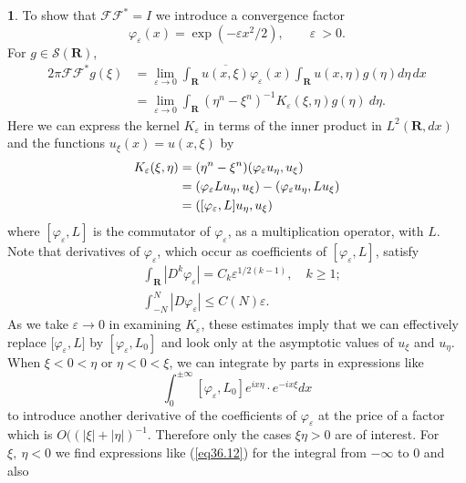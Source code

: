 \documentclass{surv-l}
\theoremstyle{plain}
\theoremstyle{definition}
\newtheorem*{sop}{\sc{Sketch of Proof}}
\numberwithin{equation}{chapter}
\begin{document}
\begin{sop}
To show that $\mathscr{F}\!\!\mathscr{F}^{*}=I$ we introduce a convergence factor
\begin{equation*}
\varphi_{\varepsilon}(x)=\exp(-\varepsilon x^{2}/2),\qquad \varepsilon\ >0.
\end{equation*}
For $g \in \mathscr{S}(\mathbf{R})$,
\begin{align*}
2\pi \mathscr{F}\!\!\mathscr{F}^{*}g(\xi)&=\lim_{\varepsilon\rightarrow 0}\int_{\mathbf{R}}\overline{u(x,\xi)}\varphi_{\varepsilon}(x)\int_{\mathbf{R}}u(x,\eta)g(\eta)d\eta \, dx\\
&=\lim_{\varepsilon\rightarrow 0}\int_{\mathbf{R}}(\eta^{n}-\xi^{n})^{-1}K_{\varepsilon}(\xi, \eta)g(\eta)\  d\eta.
\end{align*}
Here we can express the kernel $K_{\varepsilon}$ in terms of the inner product in $L^{2} (\mathbf{R}, dx)$ and the functions $u_{\xi}(x)=u(x, \xi)$ by
\begin{align}\label{eq36.11}
K_{\varepsilon}(\xi,\eta)&=(\eta^{n}-\xi^{n})(\varphi_{\varepsilon}u_{\eta}, u_{\xi})\\ \notag
&=(\varphi_{\varepsilon}Lu_{\eta}, u_{\xi})-(\varphi_{\varepsilon}u_{\eta}, Lu_{\xi})\\ \notag
&=([\varphi_{\varepsilon}, L]u_{\eta}, u_{\xi})
\end{align}
where $[\varphi_{\varepsilon}, L]$ is the commutator of $\varphi_{\varepsilon}$, as a multiplication operator, with $L$. Note that derivatives of $\varphi_{\varepsilon}$, which occur as coefficients of $[\varphi_{\varepsilon}, L]$, satisfy
\begin{align*}
&\int_{\mathbf{R}}|D^{k}\varphi_{\varepsilon}|=C_{k}\varepsilon^{1/2(k-1)},\quad k\geq 1;\\
&\int_{-N}^{N}|D\varphi_{\varepsilon}|\leq C(N)\varepsilon.
\end{align*}
As we take $\varepsilon \rightarrow 0$ in examining $K_{\varepsilon}$, these estimates imply that we can effectively replace [$\varphi_{\varepsilon},L]$ by $[\varphi_{\varepsilon}, L_{0}]$ and look only at the asymptotic values of $u_{\xi}$ and $u_{\eta}$. When $\xi <0<\eta$ or $\eta<0<\xi$, we can integrate by parts in expressions like
\begin{equation}\label{eq36.12}
\int_{0}^{\pm\infty}[\varphi_{\varepsilon}, L_{0}]e^{ix\eta}\cdot e^{-ix\xi}dx
\end{equation}
to introduce another derivative of the coefficients of $\varphi_{\varepsilon}$ at the price of a factor which is $O((|\xi|+|\eta|)^{-1}$. Therefore only the cases $\xi\eta>0$ are of interest. For $\xi,\ \eta<0$ we find expressions like (\ref{eq36.12}) for the integral from $-\infty$ to $0$ and also

\end{sop}
\end{document}
